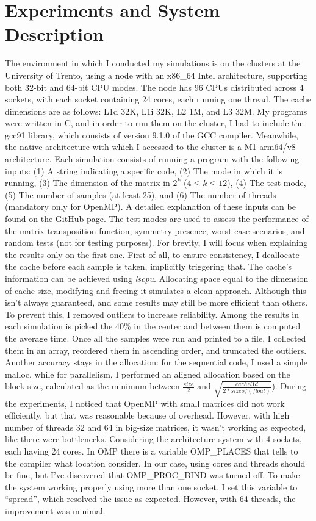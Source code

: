 \section{Experiments and System Description}
The environment in which I conducted my simulations is on the clusters at the University of Trento, using a node with an x86\_64 Intel architecture, supporting both 32-bit and 64-bit CPU modes. The node has 96 CPUs distributed across 4 sockets, with each socket containing 24 cores, each running one thread. The cache dimensions are as follows: L1d 32K, L1i 32K, L2 1M, and L3 32M. My programs were written in C, and in order to run them on the cluster, I had to include the gcc91 library, which consists of version 9.1.0 of the GCC compiler. Meanwhile, the native architecture with which I accessed to the cluster is a M1 arm64/v8 architecture. Each simulation consists of running a program with the following inputs: (1) A string indicating a specific code, (2) The mode in which it is running, (3) The dimension of the matrix in $2^k$ ($4 \leq k \leq 12$), (4) The test mode, (5) The number of samples (at least 25), and (6) The number of threads (mandatory only for OpenMP). A detailed explanation of these inputs can be found on the GitHub page. The test modes are used to assess the performance of the matrix transposition function, symmetry presence, worst-case scenarios, and random tests (not for testing purposes). For brevity, I will focus when explaining the results only on the first one. First of all, to ensure consistency, I deallocate the cache before each sample is taken, implicitly triggering that. The cache’s information can be achieved using \textit{lscpu}. Allocating space equal to the dimension of cache size, modifying and freeing it simulates a clean approach. Although this isn't always guaranteed, and some results may still be more efficient than others. To prevent this, I removed outliers to increase reliability. Among the results in each simulation is picked the 40\% in the center and between them is computed the average time. Once all the samples were run and printed to a file, I collected them in an array, reordered them in ascending order, and truncated the outliers. Another accuracy stays in the allocation: for the sequential code, I used a simple malloc, while for parallelism, I performed an aligned allocation based on the block size, calculated as the minimum between $\frac{size}{2}$ and $\sqrt{\frac{cachel1d}{2*sizeof(float)}}$). During the experiments, I noticed that OpenMP with small matrices did not work efficiently, but that was reasonable because of overhead. However, with high number of threads 32 and 64 in big-size matrices, it wasn't working as expected, like there were bottlenecks. Considering the architecture system with 4 sockets, each having 24 cores. In OMP there is a variable OMP\_PLACES that tells to the compiler what location consider. In our case, using cores and threads should be fine, but I've discovered that OMP\_PROC\_BIND was turned off. To make the system working properly using more than one socket, I set this variable to “spread”, which resolved the issue as expected. However, with 64 threads, the improvement was minimal.
